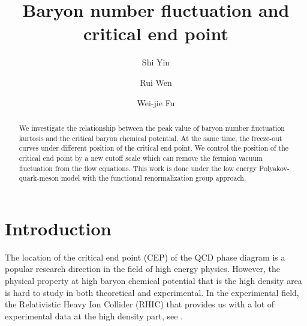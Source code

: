 \documentclass[%
reprint,
superscriptaddress,
showpacs,preprintnumbers,
 amsmath,amssymb,
 aps,
prl,
]{revtex4-1}
\begin{document}
\preprint{}

\title{Baryon number fluctuation and critical end point
}

\author{Shi Yin}

\author{Rui Wen}

\author{Wei-jie Fu}


\begin{abstract}
We investigate the relationship between the peak value of baryon number fluctuation kurtosis and the critical baryon chemical potential. At the same time, the freeze-out curves under different position of the critical end point. We control the position of the critical end point by a new cutoff scale which can remove the fermion vacuum fluctuation from the flow equations. This work is done under the low energy Polyakov-quark-meson model with the functional renormalization group approach.
\end{abstract}
\maketitle
\section{Introduction}
\label{sec:int}
The location of the critical end point (CEP) of the QCD phase diagram is a popular research direction in the field of high energy physics. However, the physical property at high baryon chemical potential that is the high density area is hard to study in both theoretical and experimental. In the experimental field, the Relativistic Heavy Ion Collider (RHIC) that provides us with a lot of experimental data at the high density part, see \cite{Adamczyk:2013dal,Luo:2015ewa,Luo:2017faz}.
\end{document}

